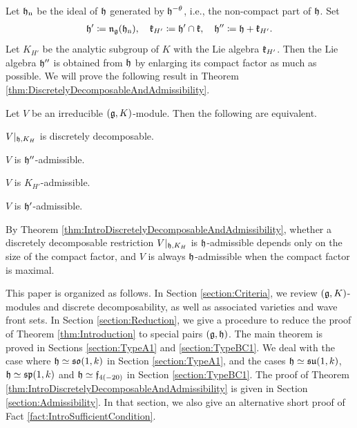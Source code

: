 Let $\mathfrak{h}_{\mathrm{n}}$ be the ideal of $\mathfrak{h}$ generated by $\mathfrak{h}^{-\theta}$, i.e., the non-compact part of $\mathfrak{h}$.
Set
\begin{align*}
	\mathfrak{h}' \coloneq \mathfrak{n}_{\mathfrak{g}}(\mathfrak{h}_{\mathrm{n}}), \quad \mathfrak{k}_{H'} \coloneq \mathfrak{h}' \cap \mathfrak{k}, \quad \mathfrak{h}'' \coloneq \mathfrak{h} + \mathfrak{k}_{H'}.
\end{align*}
Let $K_{H'}$ be the analytic subgroup of $K$ with the Lie algebra $\mathfrak{k}_{H'}$.
Then the Lie algebra $\mathfrak{h}''$ is obtained from $\mathfrak{h}$ by enlarging its compact factor as much as possible.
We will prove the following result in Theorem \ref{thm:DiscretelyDecomposableAndAdmissibility}.

\begin{theorem} \label{thm:IntroDiscretelyDecomposableAndAdmissibility}
	Let $V$ be an irreducible $(\mathfrak{g}, K)$-module.
	Then the following are equivalent.
	\begin{enumparen}
		\item $V|_{\mathfrak{h}, K_H}$ is discretely decomposable.
		\item $V$ is $\mathfrak{h}''$-admissible.
		\item $V$ is $K_{H'}$-admissible.
		\item $V$ is $\mathfrak{h}'$-admissible.
	\end{enumparen}
\end{theorem}

By Theorem \ref{thm:IntroDiscretelyDecomposableAndAdmissibility}, whether a discretely decomposable restriction $V|_{\mathfrak{h}, K_H}$ is $\mathfrak{h}$-admissible depends only on the size of the compact factor, and $V$ is always $\mathfrak{h}$-admissible when the compact factor is maximal.

This paper is organized as follows.
In Section \ref{section:Criteria}, we review $(\mathfrak{g}, K)$-modules and discrete decomposability, as well as associated varieties and wave front sets.
In Section \ref{section:Reduction}, we give a procedure to reduce the proof of Theorem \ref{thm:Introduction} to special pairs $(\mathfrak{g}, \mathfrak{h})$.
The main theorem is proved in Sections \ref{section:TypeA1} and \ref{section:TypeBC1}.
We deal with the case where $\mathfrak{h} \simeq \mathfrak{so}(1, k)$ in Section \ref{section:TypeA1}, and the cases $\mathfrak{h}\simeq\mathfrak{su}(1,k)$, $\mathfrak{h}\simeq\mathfrak{sp}(1,k)$ and $\mathfrak{h}\simeq\mathfrak{f}_{4(-20)}$ in Section \ref{section:TypeBC1}.
The proof of Theorem \ref{thm:IntroDiscretelyDecomposableAndAdmissibility} is given in Section \ref{section:Admissibility}.
In that section, we also give an alternative short proof of Fact \ref{fact:IntroSufficientCondition}.

